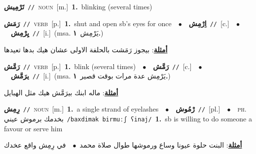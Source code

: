 \documentclass[10pt,a4paper,twoside]{article} %
\begin{document}
\begin{multicols}{2}
{\setlength\topsep{0pt}\textbf{\foreignlanguage{arabic}{تَرْمِيش}}\ {\color{gray}\texttt{//}\color{black}}\ \textsc{noun}\ [m.]\ \textbf{1.}~blinking (several times)\ } \vspace{2mm}

{\setlength\topsep{0pt}\textbf{\foreignlanguage{arabic}{رَمَش}}\ {\color{gray}\texttt{//}\color{black}}\ \textsc{verb}\ [p.]\ \textbf{1.}~shut and open sb's eyes for once\ \ $\bullet$\ \ \setlength\topsep{0pt}\textbf{\foreignlanguage{arabic}{اِرْمِش}}\ {\color{gray}\texttt{//}\color{black}}\ [c.]\ \ $\bullet$\ \ \setlength\topsep{0pt}\textbf{\foreignlanguage{arabic}{يِرْمِش}}\ {\color{gray}\texttt{//}\color{black}}\ [i.]\ \color{gray}(msa. \foreignlanguage{arabic}{يَرْمِش}~\foreignlanguage{arabic}{\textbf{١.}})\color{black}\  \begin{flushright}\color{gray}\foreignlanguage{arabic}{\textbf{\underline{\foreignlanguage{arabic}{أمثلة}}}: بيجوز رَمَشت بالحلفة الاولى عشان هيك بدها تعيدها}\end{flushright}\color{black}} \vspace{2mm}

{\setlength\topsep{0pt}\textbf{\foreignlanguage{arabic}{رَمَّش}}\ {\color{gray}\texttt{//}\color{black}}\ \textsc{verb}\ [p.]\ \textbf{1.}~blink (several times)\ \ $\bullet$\ \ \setlength\topsep{0pt}\textbf{\foreignlanguage{arabic}{رَمَّش}}\ {\color{gray}\texttt{//}\color{black}}\ [c.]\ \ $\bullet$\ \ \setlength\topsep{0pt}\textbf{\foreignlanguage{arabic}{يرَمَّش}}\ {\color{gray}\texttt{//}\color{black}}\ [i.]\ \color{gray}(msa. \foreignlanguage{arabic}{يَرْمِش عدة مرات بوقت قصير}~\foreignlanguage{arabic}{\textbf{١.}})\color{black}\  \begin{flushright}\color{gray}\foreignlanguage{arabic}{\textbf{\underline{\foreignlanguage{arabic}{أمثلة}}}: ماله ابنك بيرَمَّش هيك مثل الهبايل}\end{flushright}\color{black}} \vspace{2mm}

{\setlength\topsep{0pt}\textbf{\foreignlanguage{arabic}{رِمِش}}\ {\color{gray}\texttt{//}\color{black}}\ \textsc{noun}\ [m.]\ \textbf{1.}~a single strand of eyelashes\ \ $\bullet$\ \ \setlength\topsep{0pt}\textbf{\foreignlanguage{arabic}{رْمُوش}}\ {\color{gray}\texttt{//}\color{black}}\ [pl.]\ \ $\bullet$\ \ \textsc{ph.} \color{gray} \foreignlanguage{arabic}{بخدمك برموش عيني}\color{black}\ {\color{gray}\texttt{/{\sffamily baxdimak birmuːʃ ʕinaj}/}\color{black}}\ \textbf{1.}~sb is willing to do someone a favour or serve him\  \begin{flushright}\color{gray}\foreignlanguage{arabic}{\textbf{\underline{\foreignlanguage{arabic}{أمثلة}}}: البنت حلوة عيونا وساع ورموشها طوال صلاة محمد\ $\bullet$\ \  في رِمِش واقع عخدك}\end{flushright}\color{black}} \vspace{2mm}


\end{multicols}
\end{document}
